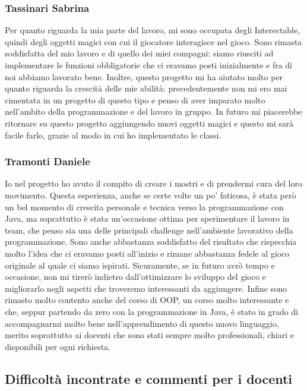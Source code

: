 \documentclass{report}
\begin{document}
\subsubsection{Tassinari Sabrina}
Per quanto riguarda la mia parte del lavoro, mi sono occupata degli Interectable, quindi degli oggetti magici con cui il giocatore interagisce nel gioco.
%
Sono rimasta soddisfatta del mio lavoro e di quello dei miei compagni: siamo riusciti ad implementare le funzioni obbligatorie che ci eravamo posti inizialmente e fra di noi abbiamo lavorato bene. 
%
Inoltre, questo progetto mi ha aiutato molto per quanto riguarda la crescità delle mie abilità: precedentemente non mi ero mai cimentata in un progetto di questo tipo e penso di aver imparato molto nell'ambito della programmazione e del lavoro in gruppo.
%
In futuro mi piacerebbe ritornare su questo progetto aggiungendo nuovi oggetti magici e questo mi sarà facile farlo, grazie al modo in cui ho implementato le classi.
%
 

\subsubsection{Tramonti Daniele}
Io nel progetto ho avuto il compito di creare i mostri e di prendermi cura del loro movimento.
%
Questa esperienza, anche se certe volte un po' faticosa, è stata però un bel momento di crescita personale e tecnica verso la programmazione con Java, ma soprattutto è stata un'occasione
%
ottima per sperimentare il lavoro in team, che penso sia una delle principali challenge nell'ambiente lavorativo della programmazione. Sono anche abbastanza soddisfatto del risultato che 
%
rispecchia molto l'idea che ci eravamo posti all'inizio e rimane abbastanza fedele al gioco originale al quale ci siamo ispirati. Sicuramente, se in futuro avrò tempo e occasione, non mi tirerò
%
indietro dall'ottimizzare lo sviluppo del gioco e migliorarlo negli aspetti che troveremo interessanti da aggiungere. Infine sono rimasto molto contento anche del corso di OOP, un corso molto
%
interessante e che, seppur partendo da zero con la programmazione in Java, è stato in grado di accompagnarmi molto bene nell'apprendimento di questo nuovo linguaggio, merito soprattutto ai docenti
%
che sono stati sempre molto professionali, chiari e disponibili per ogni richiesta.


\subsection{Difficoltà incontrate e commenti per i docenti}
\end{document}
